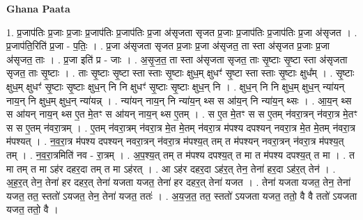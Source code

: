 \documentclass[17pt]{extarticle}
\begin{document}
\textbf{Ghana Paata } \newline

1. प्र॒जाप॑तिः प्र॒जाः प्र॒जाः प्र॒जाप॑तिः प्र॒जाप॑तिः प्र॒जा अ॑सृजता सृजत प्र॒जाः प्र॒जाप॑तिः प्र॒जाप॑तिः प्र॒जा अ॑सृजत । . प्र॒जाप॑ति॒रिति॑ प्र॒जा - प॒तिः॒ । . प्र॒जा अ॑सृजता सृजत प्र॒जाः प्र॒जा अ॑सृजत॒ ता स्ता अ॑सृजत प्र॒जाः प्र॒जा अ॑सृजत॒ ताः । . प्र॒जा इति॑ प्र - जाः । . अ॒सृ॒ज॒त॒ ता स्ता अ॑सृजता सृजत॒ ताः सृ॒ष्टाः सृ॒ष्टा स्ता अ॑सृजता सृजत॒ ताः सृ॒ष्टाः । . ताः सृ॒ष्टाः सृ॒ष्टा स्ता स्ताः सृ॒ष्टाः क्षुध॒म् क्षुधꣳ॑ सृ॒ष्टा स्ता स्ताः सृ॒ष्टाः क्षुध᳚म् । . सृ॒ष्टाः क्षुध॒म् क्षुधꣳ॑ सृ॒ष्टाः सृ॒ष्टाः क्षुध॒न् नि नि क्षुधꣳ॑ सृ॒ष्टाः सृ॒ष्टाः क्षुध॒न् नि । . क्षुध॒न् नि नि क्षुध॒म् क्षुध॒न् न्या॑यन् नाय॒न् नि क्षुध॒म् क्षुध॒न् न्या॑यन्न् । . न्या॑यन् नाय॒न् नि न्या॑य॒न् थ्स स आ॑य॒न् नि न्या॑य॒न् थ्सः । . आ॒य॒न् थ्स स आ॑यन् नाय॒न् थ्स ए॒त मे॒तꣳ स आ॑यन् नाय॒न् थ्स ए॒तम् । . स ए॒त मे॒तꣳ स स ए॒तम् न॑वरा॒त्रन् न॑वरा॒त्र मे॒तꣳ स स ए॒तम् न॑वरा॒त्रम् । . ए॒तम् न॑वरा॒त्रम् न॑वरा॒त्र मे॒त मे॒तम् न॑वरा॒त्र म॑पश्य दपश्यन् नवरा॒त्र मे॒त मे॒तम् न॑वरा॒त्र म॑पश्यत् । . न॒व॒रा॒त्र म॑पश्य दपश्यन् नवरा॒त्रन् न॑वरा॒त्र म॑पश्य॒त् तम् त म॑पश्यन् नवरा॒त्रन् न॑वरा॒त्र म॑पश्य॒त् तम् । . न॒व॒रा॒त्रमिति॑ नव - रा॒त्रम् । . अ॒प॒श्य॒त् तम् त म॑पश्य दपश्य॒त् त मा त म॑पश्य दपश्य॒त् त मा । . त मा तम् त मा ऽह॑र दहर॒दा तम् त मा ऽह॑रत् । . आ ऽह॑र दहर॒दा ऽह॑र॒त् तेन॒ तेना॑ हर॒दा ऽह॑र॒त् तेन॑ । . अ॒ह॒र॒त् तेन॒ तेना॑ हर दहर॒त् तेना॑ यजता यजत॒ तेना॑ हर दहर॒त् तेना॑ यजत । . तेना॑ यजता यजत॒ तेन॒ तेना॑ यजत॒ तत॒ स्ततो॑ ऽयजत॒ तेन॒ तेना॑ यजत॒ ततः॑ । . अ॒य॒ज॒त॒ तत॒ स्ततो॑ ऽयजता यजत॒ ततो॒ वै वै ततो॑ ऽयजता यजत॒ ततो॒ वै । \newline
\end{document}
